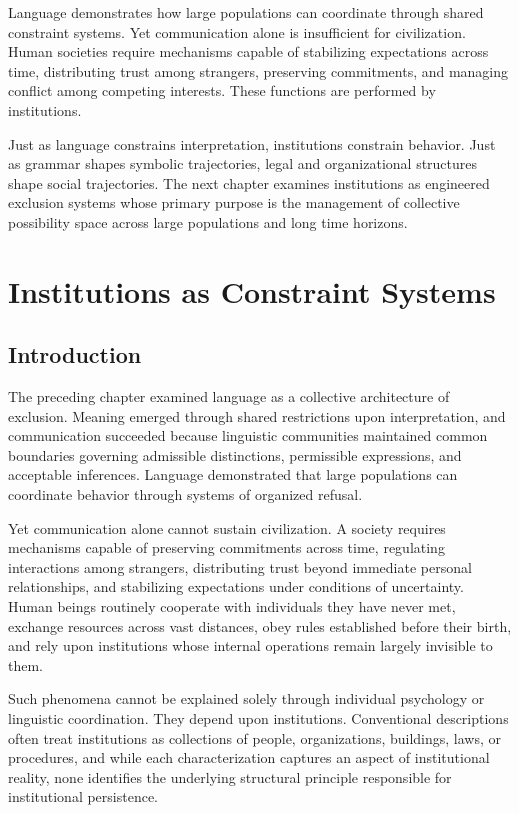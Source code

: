 \documentclass[11pt,oneside]{book}
\theoremstyle{plain}
\theoremstyle{definition}
\theoremstyle{remark}
\begin{document}
Language demonstrates how large populations can coordinate through shared constraint systems. Yet communication alone is insufficient for civilization. Human societies require mechanisms capable of stabilizing expectations across time, distributing trust among strangers, preserving commitments, and managing conflict among competing interests. These functions are performed by institutions.

Just as language constrains interpretation, institutions constrain behavior. Just as grammar shapes symbolic trajectories, legal and organizational structures shape social trajectories. The next chapter examines institutions as engineered exclusion systems whose primary purpose is the management of collective possibility space across large populations and long time horizons.

\chapter{Institutions as Constraint Systems}

\section{Introduction}

The preceding chapter examined language as a collective architecture of exclusion. Meaning emerged through shared restrictions upon interpretation, and communication succeeded because linguistic communities maintained common boundaries governing admissible distinctions, permissible expressions, and acceptable inferences. Language demonstrated that large populations can coordinate behavior through systems of organized refusal.

Yet communication alone cannot sustain civilization. A society requires mechanisms capable of preserving commitments across time, regulating interactions among strangers, distributing trust beyond immediate personal relationships, and stabilizing expectations under conditions of uncertainty. Human beings routinely cooperate with individuals they have never met, exchange resources across vast distances, obey rules established before their birth, and rely upon institutions whose internal operations remain largely invisible to them.

Such phenomena cannot be explained solely through individual psychology or linguistic coordination. They depend upon institutions. Conventional descriptions often treat institutions as collections of people, organizations, buildings, laws, or procedures, and while each characterization captures an aspect of institutional reality, none identifies the underlying structural principle responsible for institutional persistence.
\end{document}
